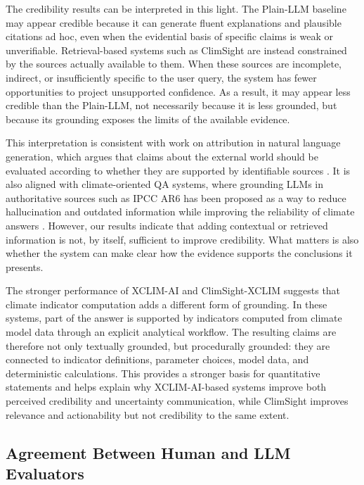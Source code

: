 The credibility results can be interpreted in this light.
The Plain-LLM baseline may appear credible because it can generate fluent explanations and plausible citations ad hoc, even when the evidential basis of specific claims is weak or unverifiable.
Retrieval-based systems such as ClimSight are instead constrained by the sources actually available to them.
When these sources are incomplete, indirect, or insufficiently specific to the user query, the system has fewer opportunities to project unsupported confidence.
As a result, it may appear less credible than the Plain-LLM, not necessarily because it is less grounded, but because its grounding exposes the limits of the available evidence.

This interpretation is consistent with work on attribution in natural language generation, which argues that claims about the external world should be evaluated according to whether they are supported by identifiable sources \citep{rashkin_measuring_2022}.
It is also aligned with climate-oriented QA systems, where grounding LLMs in authoritative sources such as IPCC AR6 has been proposed as a way to reduce hallucination and outdated information while improving the reliability of climate answers \citep{vaghefi_chatclimate_2023}.
However, our results indicate that adding contextual or retrieved information is not, by itself, sufficient to improve credibility.
What matters is also whether the system can make clear how the evidence supports the conclusions it presents.

The stronger performance of XCLIM-AI and ClimSight-XCLIM suggests that climate indicator computation adds a different form of grounding.
In these systems, part of the answer is supported by indicators computed from climate model data through an explicit analytical workflow.
The resulting claims are therefore not only textually grounded, but procedurally grounded: they are connected to indicator definitions, parameter choices, model data, and deterministic calculations.
This provides a stronger basis for quantitative statements and helps explain why XCLIM-AI-based systems improve both perceived credibility and uncertainty communication, while ClimSight improves relevance and actionability but not credibility to the same extent.

\subsection{Agreement Between Human and LLM Evaluators} \label{agreement}

